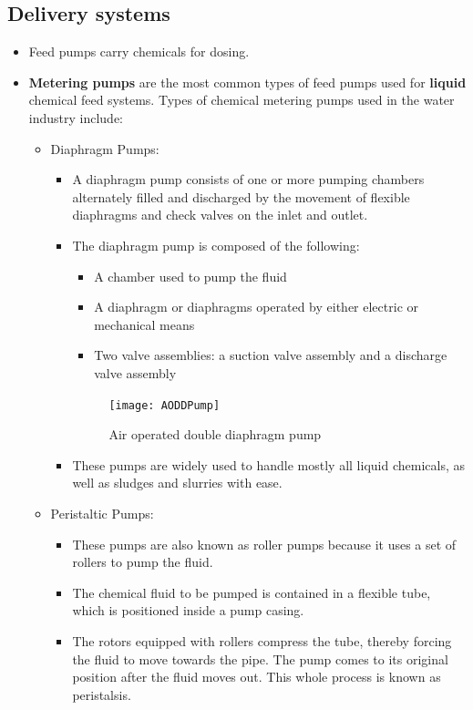 \subsection{Delivery systems}
\begin{itemize}
\item Feed pumps carry chemicals for dosing.   
\item \textbf{Metering pumps} are the most common types of feed pumps used for \textbf{liquid} chemical feed systems. Types of chemical metering pumps used in the water industry include:
\begin{itemize}
\item Diaphragm Pumps: 
\begin{itemize}
\item A diaphragm pump consists of one or more pumping chambers alternately filled and discharged by the movement of flexible diaphragms and check valves on the inlet and outlet.
\item The diaphragm pump is composed of the following:
\begin{itemize}
\item A chamber used to pump the fluid
\item A diaphragm or diaphragms operated by either electric or mechanical means
\item Two valve assemblies: a suction valve assembly and a discharge valve assembly
\end{itemize}
\begin{figure}[H]
\begin{center}
\texttt{[image: AODDPump]}
\vspace{0.2cm}
\caption{Air operated double diaphragm pump} 
\end{center}
\end{figure}
\item These pumps are widely used to handle mostly all liquid chemicals, as well as sludges and slurries with ease.
\end{itemize}
\item Peristaltic Pumps:
\begin{itemize}
\item These pumps are also known as roller pumps because it uses a set of rollers to pump the fluid. 
\item The chemical fluid to be pumped is contained in a flexible tube, which is positioned inside a pump casing.
\item The rotors equipped with rollers compress the tube, thereby forcing the fluid to move towards the pipe. The pump comes to its original position after the fluid moves out. This whole process is known as peristalsis. 

\end{itemize}
\end{itemize}
\end{itemize}

